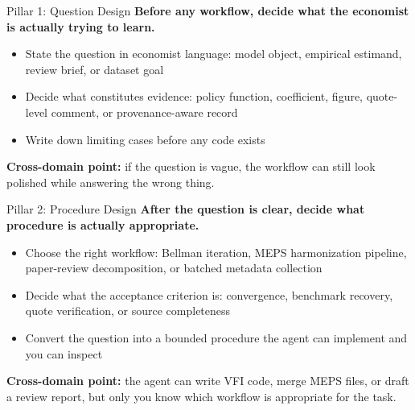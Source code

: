 \documentclass[10pt,english,aspectratio=169]{beamer}
\begin{document}
\begin{frame}{Pillar 1: Question Design}
\textbf{Before any workflow, decide what the economist is actually trying to learn.}
\begin{itemize}
    \item State the question in economist language: model object, empirical estimand, review brief, or dataset goal
    \item Decide what constitutes evidence: policy function, coefficient, figure, quote-level comment, or provenance-aware record
    \item Write down limiting cases before any code exists
\end{itemize}

\vspace{0.2cm}

\textbf{Cross-domain point:} if the question is vague, the workflow can still look polished while answering the wrong thing.
\end{frame}

\begin{frame}{Pillar 2: Procedure Design}
\textbf{After the question is clear, decide what procedure is actually appropriate.}
\begin{itemize}
    \item Choose the right workflow: Bellman iteration, MEPS harmonization pipeline, paper-review decomposition, or batched metadata collection
    \item Decide what the acceptance criterion is: convergence, benchmark recovery, quote verification, or source completeness
    \item Convert the question into a bounded procedure the agent can implement and you can inspect
\end{itemize}

\vspace{0.25cm}

\textbf{Cross-domain point:} the agent can write VFI code, merge MEPS files, or draft a review report, but only you know which workflow is appropriate for the task.
\end{frame}
\end{document}
